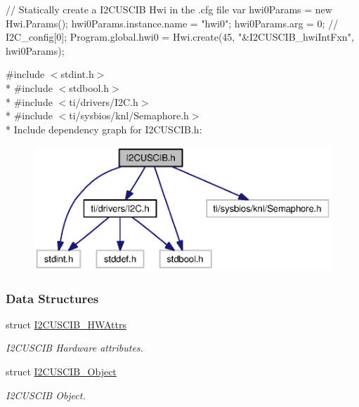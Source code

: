 \begin{DoxyCode}
\textcolor{comment}{// Statically create a I2CUSCIB Hwi in the .cfg file}
var hwi0Params = \textcolor{keyword}{new} Hwi.Params();
hwi0Params.instance.name = \textcolor{stringliteral}{"hwi0"};
hwi0Params.arg = 0;  \textcolor{comment}{// I2C\_config[0];}
Program.global.hwi0 = Hwi.create(45, \textcolor{stringliteral}{"&I2CUSCIB\_hwiIntFxn"}, hwi0Params);
\end{DoxyCode}
 

{\ttfamily \#include $<$stdint.\+h$>$}\\*
{\ttfamily \#include $<$stdbool.\+h$>$}\\*
{\ttfamily \#include $<$ti/drivers/\+I2\+C.\+h$>$}\\*
{\ttfamily \#include $<$ti/sysbios/knl/\+Semaphore.\+h$>$}\\*
Include dependency graph for I2\+C\+U\+S\+C\+I\+B.\+h\+:
\nopagebreak
\begin{figure}[H]
\begin{center}
\leavevmode
\includegraphics[width=350pt]{_i2_c_u_s_c_i_b_8h__incl}
\end{center}
\end{figure}
\subsubsection*{Data Structures}
\begin{DoxyCompactItemize}
\item 
struct \hyperlink{struct_i2_c_u_s_c_i_b___h_w_attrs}{I2\+C\+U\+S\+C\+I\+B\+\_\+\+H\+W\+Attrs}
\begin{DoxyCompactList}\small\item\em I2\+C\+U\+S\+C\+I\+B Hardware attributes. \end{DoxyCompactList}\item 
struct \hyperlink{struct_i2_c_u_s_c_i_b___object}{I2\+C\+U\+S\+C\+I\+B\+\_\+\+Object}
\begin{DoxyCompactList}\small\item\em I2\+C\+U\+S\+C\+I\+B Object. \end{DoxyCompactList}\end{DoxyCompactItemize}
